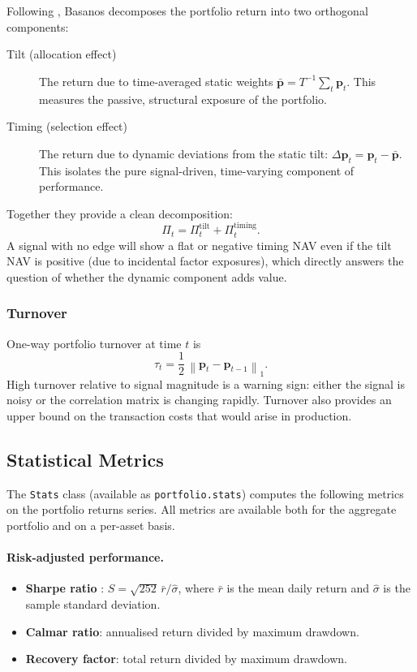 \documentclass[11pt,a4paper]{article}
\newcommand{\norm}[1]{\left\|#1\right\|}
\begin{document}
Following \citet{brinson1986}, Basanos decomposes the portfolio return into
two orthogonal components:
\begin{description}
  \item[Tilt (allocation effect)] The return due to time-averaged static
    weights $\bar{\mathbf{p}} = T^{-1}\sum_t \mathbf{p}_t$.  This measures
    the passive, structural exposure of the portfolio.
  \item[Timing (selection effect)] The return due to dynamic deviations from
    the static tilt: $\Delta\mathbf{p}_t = \mathbf{p}_t - \bar{\mathbf{p}}$.
    This isolates the pure signal-driven, time-varying component of performance.
\end{description}
Together they provide a clean decomposition:
\begin{equation}
  \Pi_t = \Pi_t^\text{tilt} + \Pi_t^\text{timing}.
\end{equation}
A signal with no edge will show a flat or negative timing NAV even if the
tilt NAV is positive (due to incidental factor exposures), which directly
answers the question of whether the dynamic component adds value.

\subsubsection{Turnover}

One-way portfolio turnover at time $t$ is
\begin{equation}
  \tau_t = \frac{1}{2}\,\norm{\mathbf{p}_t - \mathbf{p}_{t-1}}_1.
\end{equation}
High turnover relative to signal magnitude is a warning sign: either the
signal is noisy or the correlation matrix is changing rapidly.  Turnover also
provides an upper bound on the transaction costs that would arise in
production.

\subsection{Statistical Metrics}
\label{sec:stats}

The \texttt{Stats} class (available as \texttt{portfolio.stats}) computes
the following metrics on the portfolio returns series.  All metrics are
available both for the aggregate portfolio and on a per-asset basis.

\paragraph{Risk-adjusted performance.}
\begin{itemize}
  \item \textbf{Sharpe ratio} \citep{sharpe1966}:
    $S = \sqrt{252}\,\bar{r}/\hat{\sigma}$, where $\bar{r}$ is the mean
    daily return and $\hat{\sigma}$ is the sample standard deviation.
  \item \textbf{Calmar ratio}: annualised return divided by maximum drawdown.
  \item \textbf{Recovery factor}: total return divided by maximum drawdown.
\end{itemize}
\end{document}

